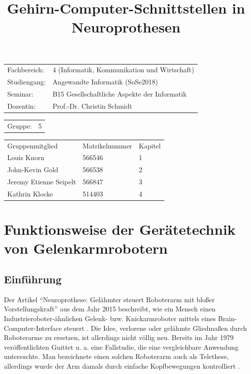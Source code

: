 \documentclass[11pt,ngerman,parskip=half]{scrartcl}
\author{}
\title{Gehirn-Computer-Schnittstellen in Neuroprothesen}
\begin{document}
\maketitle
\begin{tabular}{ll}
  Fachbereich: & 4 (Informatik, Kommunikation und Wirtschaft) \\
  Studiengang: & Angewandte Informatik (SoSe2018)             \\
  Seminar:     & B15 Gesellschaftliche Aspekte der Informatik \\
  Dozentin:    & Prof.-Dr. Christin Schmidt                   \\
\end{tabular}

\begin{tabular}{ll}
  Gruppe: & 5 \\
\end{tabular}

\begin{tabular}{lll}
  Gruppenmitglied        & Matrikelnummer & Kapitel\\
  Louis Knorn            & 566546         & 1\\
  John-Kevin Gold        & 566538         & 2\\
  Jeremy Etienne Seipelt & 566847         & 3\\
  Kathrin Klocke         & 514403         & 4\\
\end{tabular}

\newpage
\tableofcontents
\newpage
\listoffigures
\newpage
\listoftables
\newpage

\section{Funktionsweise der Gerätetechnik von Gelenkarmrobotern}
\subsection{Einführung}
\label{subsec:Einführung}
Der Artikel \enquote{Neuroprothese: Gelähmter steuert Roboterarm mit bloßer
Vorstellungskraft} aus dem Jahr 2015 beschreibt, wie ein Mensch einen
Industrieroboter-ähnlichen Gelenk- bzw. Knickarmroboter mittels eines
Brain-Computer-Interface steuert
\parencite[vgl.][]{merkelt_neuroprothesen:_2015}. Die Idee, verlorene oder
gelähmte Gliedmaßen durch Roboterarme zu ersetzen, ist allerdings nicht völlig
neu. Bereits im Jahr 1979 veröffentlichten Guittet u. a. eine Fallstudie, die
eine vergleichbare Anwendung untersuchte. Man bezeichnete einen solchen
Roboterarm auch als Telethese, allerdings wurde der Arm damals durch einfache
Kopfbewegungen kontrolliert \parencite[vgl.][]{guittet_spartacus_1979}.
\end{document}
